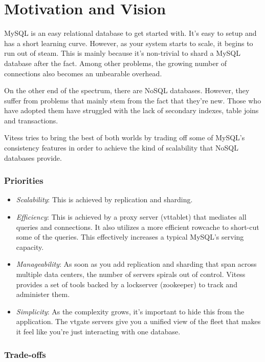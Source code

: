 \section{Motivation and Vision}\label{Motivation-and-Vision}

MySQL is an easy relational database to get started with.
It's easy to setup and has a short learning curve.
However, as your system starts to scale, it begins to run out of steam.
This is mainly because it's non-trivial to shard a MySQL database after the fact.
Among other problems, the growing number of connections also becomes an
unbearable overhead.

On the other end of the spectrum, there are NoSQL databases.
However, they suffer from problems that mainly stem from the fact that they're new.
Those who have adopted them have struggled with the lack of secondary indexes,
table joins and transactions.

Vitess tries to bring the best of both worlds by trading off
some of MySQL's consistency features in order to achieve the
kind of scalability that NoSQL databases provide.

\subsubsection{Priorities}\hypertarget{priorities}{}\label{priorities}

\begin{itemize}
\item \emph{Scalability}: This is achieved by replication and sharding.
\item \emph{Efficiency}: This is achieved by a proxy server (vttablet) that mediates
all queries and connections.
It also utilizes a more efficient rowcache to short-cut some of the queries.
This effectively increases a typical MySQL's serving capacity.
\item \emph{Manageability}: As soon as you add replication and sharding that span
across multiple data centers, the number of servers spirals out of control.
Vitess provides a set of tools backed by a lockserver (zookeeper) to
track and administer them.
\item \emph{Simplicity}: As the complexity grows, it's important to hide this
from the application.
The vtgate servers give you a unified view of the fleet that makes
it feel like you're just interacting with one database.
\end{itemize}

\subsubsection{Trade-offs}\hypertarget{trade-offs}{}\label{trade-offs}

